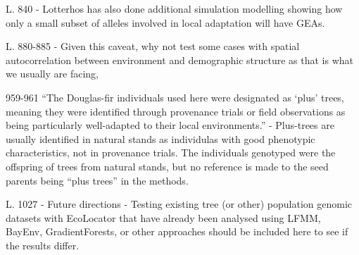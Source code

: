 
\begin{point}{} %
L. 840 - Lotterhos has also done additional simulation modelling showing how only a small subset of alleles involved in local adaptation will have GEAs.
\end{point}


\begin{point}{} %
L. 880-885 - Given this caveat, why not test some cases with spatial autocorrelation between environment and demographic structure as that is what we usually are facing,
\end{point}


\begin{point}{} %
959-961 ``The Douglas-fir individuals used here were designated as `plus' trees, meaning they were identified through provenance trials or field observations as being particularly well-adapted to their local environments.'' - Plus-trees are usually identified in natural stands as individulas with good phenotypic characteristics, not in provenance trials. The individuals genotyped were the offspring of trees from natural stands, but no reference is made to the seed parents being ``plus trees'' in the methods.
\end{point}


\begin{point}{} %
L. 1027 - Future directions - Testing existing tree (or other) population genomic datasets with EcoLocator that have already been analysed using LFMM, BayEnv, GradientForests, or other approaches should be included here to see if the results differ.
\end{point}

